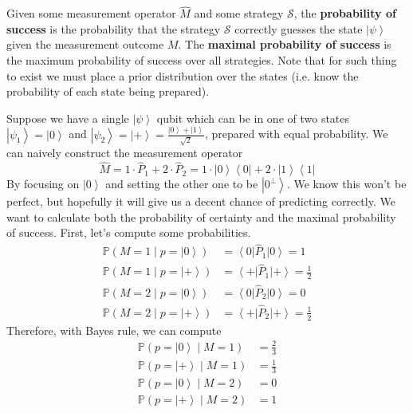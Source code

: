 \documentclass{article}
\newcommand{\ket}[1]{\ensuremath{\left|#1\right\rangle}}
\newcommand{\bra}[1]{\ensuremath{\left\langle#1\right|}}
\begin{document}
    \begin{definition}
      Given some measurement operator $\hat{M}$ and some strategy $\mathcal{S}$, the \textbf{probability of success} is the probability that the strategy $\mathcal{S}$ correctly guesses the state $\ket{\psi}$ given the measurement outcome $M$. The \textbf{maximal probability of success} is the maximum probability of success over all strategies. Note that for such thing to exist we must place a prior distribution over the states (i.e. know the probability of each state being prepared). 
    \end{definition}

    \begin{example}
      Suppose we have a single $\ket{\psi}$ qubit which can be in one of two states $\ket{\psi_1} = \ket{0}$ and $\ket{\psi_2} = \ket{+} = \frac{\ket{0} + \ket{1}}{\sqrt{2}}$, prepared with equal probability. We can naively construct the measurement operator 
      \begin{equation}
        \hat{M} = 1 \cdot \hat{P}_1 + 2 \cdot \hat{P}_2 = 1 \cdot \ket{0} \bra{0} + 2 \cdot \ket{1} \bra{1}
      \end{equation} 
      By focusing on $\ket{0}$ and setting the other one to be $\ket{0^\perp}$. We know this won't be perfect, but hopefully it will give us a decent chance of predicting correctly. We want to calculate both the probability of certainty and the maximal probability of success. First, let's compute some probabilities. 
      \begin{align}
        \mathbb{P}(M = 1 \mid p = \ket{0}) & = \bra{0} \hat{P}_1 \ket{0} = 1 \\ 
        \mathbb{P}(M = 1 \mid p = \ket{+}) & = \bra{+} \hat{P}_1 \ket{+} = \frac{1}{2} \\ 
        \mathbb{P}(M = 2 \mid p = \ket{0}) & = \bra{0} \hat{P}_2 \ket{0} = 0 \\ 
        \mathbb{P}(M = 2 \mid p = \ket{+}) & = \bra{+} \hat{P}_2 \ket{+} = \frac{1}{2} 
      \end{align}
      Therefore, with Bayes rule, we can compute 
      \begin{align}
        \mathbb{P}(p = \ket{0} \mid M = 1) & = \frac{2}{3} \\ 
        \mathbb{P}(p = \ket{+} \mid M = 1) & = \frac{1}{3} \\ 
        \mathbb{P}(p = \ket{0} \mid M = 2) & = 0 \\ 
        \mathbb{P}(p = \ket{+} \mid M = 2) & = 1

\end{align}
\end{example}
\end{document}
